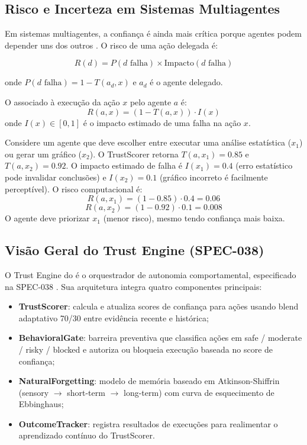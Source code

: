 \subsection{Risco e Incerteza em Sistemas Multiagentes}

Em sistemas multiagentes, a confiança é ainda mais crítica porque
agentes podem depender uns dos outros \cite{wooldridge2009multiagent,
weiss2013multiagent}. O risco de uma ação delegada é:

\[
R(d) = P(d \text{ falha}) \times \text{Impacto}(d \text{ falha})
\]

onde $P(d \text{ falha}) = 1 - T(a_d, x)$ e $a_d$ é o agente
delegado.

\begin{definicao}
O  associado à execução da ação $x$
pelo agente $a$ é:
\[
R(a, x) = (1 - T(a, x)) \cdot I(x)
\]
onde $I(x) \in [0,1]$ é o impacto estimado de uma falha na ação $x$.
\end{definicao}

\begin{exemplo}
Considere um agente que deve escolher entre executar uma análise
estatística ($x_1$) ou gerar um gráfico ($x_2$). O TrustScorer
retorna $T(a, x_1) = 0.85$ e $T(a, x_2) = 0.92$. O impacto estimado
de falha é $I(x_1) = 0.4$ (erro estatístico pode invalidar conclusões)
e $I(x_2) = 0.1$ (gráfico incorreto é facilmente perceptível). O
risco computacional é:
\[
R(a, x_1) = (1 - 0.85) \cdot 0.4 = 0.06
\]
\[
R(a, x_2) = (1 - 0.92) \cdot 0.1 = 0.008
\]
O agente deve priorizar $x_1$ (menor risco), mesmo tendo confiança
mais baixa.
\end{exemplo}

\subsection{Visão Geral do Trust Engine (SPEC-038)}

O Trust Engine do \opencodeeco{} é o orquestrador de autonomia
comportamental, especificado na SPEC-038 \cite{opencode2026spec038}.
Sua arquitetura integra quatro componentes principais:

\begin{itemize}
\item \textbf{TrustScorer}: calcula e atualiza scores de confiança
para ações usando blend adaptativo 70/30 entre evidência recente e
histórica;
\item \textbf{BehavioralGate}: barreira preventiva que classifica
ações em safe / moderate / risky / blocked e autoriza ou bloqueia
execução baseada no score de confiança;
\item \textbf{NaturalForgetting}: modelo de memória baseado em
Atkinson-Shiffrin (sensory $\to$ short-term $\to$ long-term) com
curva de esquecimento de Ebbinghaus;
\item \textbf{OutcomeTracker}: registra resultados de execuções para
realimentar o aprendizado contínuo do TrustScorer.
\end{itemize}

